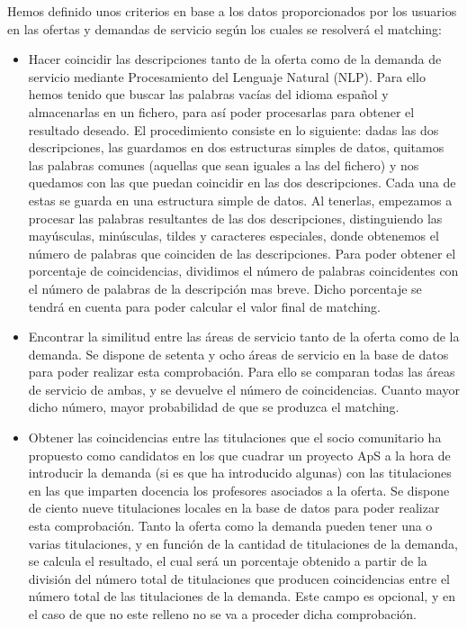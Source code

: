 \documentclass[11pt]{book}
\begin{document}
Hemos definido unos criterios en base a los datos proporcionados por los usuarios en las ofertas y demandas de servicio según los cuales se resolverá el matching:

\begin{itemize} 	
	\item Hacer coincidir las descripciones tanto de la oferta como de la demanda de servicio mediante Procesamiento del Lenguaje Natural (NLP).
	Para ello hemos tenido que buscar las palabras vacías del idioma español y almacenarlas en un fichero, para así poder  procesarlas para obtener el resultado deseado. El procedimiento consiste en lo siguiente: dadas las dos descripciones, las guardamos en dos estructuras simples de datos, quitamos las palabras comunes (aquellas que sean iguales a las del fichero) y nos quedamos con las que puedan coincidir en las dos descripciones. Cada una de estas se guarda en una estructura simple de datos. Al tenerlas, empezamos a procesar las palabras resultantes de las dos descripciones, distinguiendo las mayúsculas, minúsculas, tildes y caracteres especiales, donde obtenemos el número de palabras que coinciden de las descripciones. Para poder obtener el porcentaje de coincidencias, dividimos el número de palabras coincidentes con el número de palabras de la descripción mas breve. Dicho porcentaje se tendrá en cuenta para poder calcular el valor final de matching.
	
	\item Encontrar la similitud entre las áreas de servicio tanto de la oferta como de la demanda. Se dispone de setenta y ocho áreas de servicio en la base de datos para poder realizar esta comprobación. Para ello se comparan todas las áreas de servicio de ambas, y se devuelve el número de coincidencias. Cuanto mayor dicho número, mayor probabilidad de que se produzca el matching.
	
	\item Obtener las coincidencias entre las titulaciones que el socio
	comunitario ha propuesto como candidatos en los que cuadrar un proyecto
	ApS a la hora de introducir la demanda (si es que ha introducido algunas) con las titulaciones en las que imparten docencia los profesores asociados a la oferta. 
	Se dispone de ciento nueve titulaciones locales en la base de datos para poder realizar esta comprobación. Tanto la oferta como la demanda pueden tener una o varias titulaciones, y en función de la cantidad de titulaciones de la demanda, se calcula el resultado, el cual será un porcentaje obtenido a partir de la división del número total de titulaciones que producen coincidencias entre el  número total de las titulaciones de la demanda. Este campo es opcional, y en el caso de que no este relleno no se va a proceder dicha comprobación.
	

\end{itemize}
\end{document}
